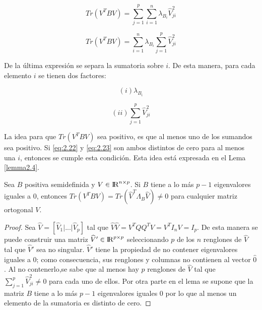 \begin{equation*} 
Tr(V^T B V) = \sum \limits_{j=1}^{p} \sum\limits_{i=1}^{n} \lambda_{B_i} \widehat{V}_{ji}^2
\end{equation*}

\begin{equation}\label{eq:2.21}
Tr(V^T B V) = \sum\limits_{i=1}^{n} \lambda_{B_i} \sum \limits_{j=1}^{p} \widehat{V}_{ji}^2    
\end{equation}

De la última expresión se separa la sumatoria sobre $i$. De esta manera, para cada elemento $i$ se tienen dos factores:

\begin{equation}\label{eq:2.22}
(i) \lambda_{B_i}
\end{equation}

 \begin{equation}\label{eq:2.23}
 (ii) \sum \limits_{j=1}^{p} \widehat{V}_{ji}^2   
 \end{equation}
 

 La idea para que $Tr(V^T B V)$ sea positivo, es que al menos uno de los sumandos sea positivo. Si \ref{eq:2.22} y \ref{eq:2.23} son ambos distintos de cero para al menos una $i$, entonces se cumple esta condición. Esta idea está expresada en el Lema \ref{lemma2.4}.

\begin{lemma}\label{lemma2.4}
Sea $B$ positiva semidefinida y $V \in {\rm I\!R}^{n\times p}$. Si $B$ tiene a lo más $p-1$ eigenvalores iguales a $0$, entonces $Tr(V^T B V)  = Tr(\widehat{V}^T \Lambda_{B} \widehat{V}) \neq 0$  para cualquier matriz ortogonal $V$.
\end{lemma}

\begin{proof}
Sea $\widehat{V} = [\widehat{V}_1 | ... | \widehat{V}_p]$ tal que $\widehat{V} \widehat{V} = V^T Q Q^T V = V^T I_n V  = I_p$. De esta manera se puede construir una matriz $\widehat{V}' \in {\rm I\!R}^{p \times p}$ seleccionando $p$ de los $n$ renglones de $\widehat{V}$ tal que $\widehat{V}'$ sea no singular. $\widehat{V}'$ tiene la propiedad de no contener eigenvalores iguales a 0; como consecuencia, sus renglones y columnas no contienen al vector $\widehat{0}$. Al no contenerlo,se sabe que al menos hay $p$ renglones de $\widehat{V}$ tal que $\sum_{j=1}^{p}\widehat{V}_{ji}^2 \neq 0$ para cada uno de ellos. Por otra parte en el lema se supone que la matriz $B$ tiene a lo más $p-1$ eigenvalores iguales $0$ por lo que al menos un elemento de la sumatoria es distinto de cero.
\end{proof}

